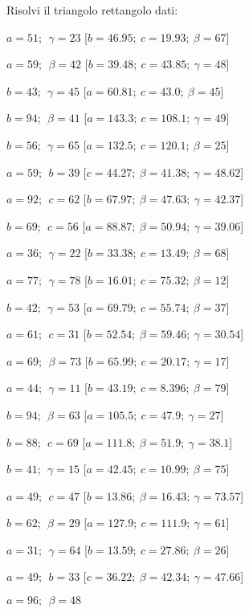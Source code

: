 \begin{esercizio}\label{ese:}
 Risolvi il triangolo rettangolo dati:
 \begin{enumeratea}
  \item  \(a=51;~~\gamma=23\)
   \hfill [\(b=46.95;~c=19.93;~\beta=67\)]
  \item  \(a=59;~~\beta=42\)
   \hfill [\(b=39.48;~c=43.85;~\gamma=48\)]
  \item  \(b=43;~~\gamma=45\)
   \hfill [\(a=60.81;~c=43.0;~\beta=45\)]
  \item  \(b=94;~~\beta=41\)
   \hfill [\(a=143.3;~c=108.1;~\gamma=49\)]
  \item  \(b=56;~~\gamma=65\)
   \hfill [\(a=132.5;~c=120.1;~\beta=25\)]
  \item  \(a=59;~~b=39\)
   \hfill [\(c=44.27;~\beta=41.38;~\gamma=48.62\)]
  \item  \(a=92;~~c=62\)
   \hfill [\(b=67.97;~\beta=47.63;~\gamma=42.37\)]
  \item  \(b=69;~~c=56\)
   \hfill [\(a=88.87;~\beta=50.94;~\gamma=39.06\)]
  \item  \(a=36;~~\gamma=22\)
   \hfill [\(b=33.38;~c=13.49;~\beta=68\)]
  \item  \(a=77;~~\gamma=78\)
   \hfill [\(b=16.01;~c=75.32;~\beta=12\)]
  \item  \(b=42;~~\gamma=53\)
   \hfill [\(a=69.79;~c=55.74;~\beta=37\)]
  \item  \(a=61;~~c=31\)
   \hfill [\(b=52.54;~\beta=59.46;~\gamma=30.54\)]
  \item  \(a=69;~~\beta=73\)
   \hfill [\(b=65.99;~c=20.17;~\gamma=17\)]
  \item  \(a=44;~~\gamma=11\)
   \hfill [\(b=43.19;~c=8.396;~\beta=79\)]
  \item  \(b=94;~~\beta=63\)
   \hfill [\(a=105.5;~c=47.9;~\gamma=27\)]
  \item  \(b=88;~~c=69\)
   \hfill [\(a=111.8;~\beta=51.9;~\gamma=38.1\)]
  \item  \(b=41;~~\gamma=15\)
   \hfill [\(a=42.45;~c=10.99;~\beta=75\)]
  \item  \(a=49;~~c=47\)
   \hfill [\(b=13.86;~\beta=16.43;~\gamma=73.57\)]
  \item  \(b=62;~~\beta=29\)
   \hfill [\(a=127.9;~c=111.9;~\gamma=61\)]
  \item  \(a=31;~~\gamma=64\)
   \hfill [\(b=13.59;~c=27.86;~\beta=26\)]
  \item  \(a=49;~~b=33\)
   \hfill [\(c=36.22;~\beta=42.34;~\gamma=47.66\)]
  \item  \(a=96;~~\beta=48\)

\end{enumeratea}
\end{esercizio}
